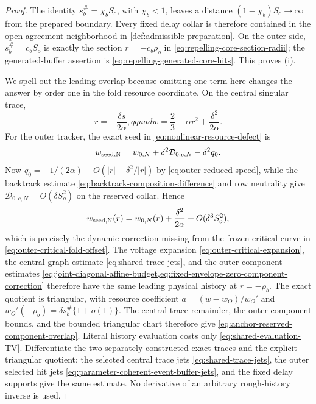 \begin{proof}
The identity \(s_b^\#=\chi_bS_c\), with \(\chi_b<1\), leaves a distance
\((1-\chi_b)S_c\to\infty\) from the prepared boundary.  Every fixed delay
collar is therefore contained in the open agreement neighborhood in
\cref{def:admissible-preparation}.  On the outer side,
\(s_b^\#=c_bS_o\) is exactly the section
\(r=-c_b\rho_o\) in
\cref{eq:repelling-core-section-radii}; the generated-buffer assertion is
\cref{eq:repelling-generated-core-hits}.  This proves (i).

We spell out the leading overlap because omitting one term here changes the
answer by order one in the fold resource coordinate.  On the central
singular trace,
\begin{equation}
 r=-\frac{\delta s}{2\alpha},qquad
 w=\frac23-\alpha r^2+\frac{\delta^2}{2\alpha}.     \label{eq:anchor-central-leading-overlap}
\end{equation}
For the outer tracker, the exact seed in
\cref{eq:nonlinear-resource-defect} is
\[
 w_{\rm seed,N}=w_{0,N}
       +\delta^2\mathcal D_{0,c,N}-\delta^2q_0.
\]
Now \(q_0=-1/(2\alpha)+O(|r|+\delta^2/|r|)\) by
\cref{eq:outer-reduced-speed}, while the backtrack estimate
\cref{eq:backtrack-composition-difference} and row neutrality give
\(\mathcal D_{0,c,N}=O(\delta S_o^2)\) on the reserved collar.  Hence
\begin{equation}
 w_{\rm seed,N}(r)
 =w_{0,N}(r)+\frac{\delta^2}{2\alpha}
       +O(\delta^3S_o^2),                           \label{eq:anchor-outer-dynamic-overlap}
\end{equation}
which is precisely the dynamic correction missing from the frozen critical
curve in \cref{eq:outer-critical-fold-offset}.  The voltage expansion
\cref{eq:outer-critical-expansion}, the central graph estimate
\cref{eq:shared-trace-jets}, and the outer component estimates
\cref{eq:joint-diagonal-affine-budget,eq:fixed-envelope-zero-component-correction}
therefore have the same leading physical history at \(r=-\rho_b\).
The exact quotient is triangular, with resource coefficient
\(a=(w-w_O)/w_O'\) and
\(w_O'(-\rho_b)=\delta s_b^\#\{1+o(1)\}\).  The central trace remainder,
the outer component bounds, and the bounded triangular chart therefore give
\cref{eq:anchor-reserved-component-overlap}.  Literal history evaluation
costs only \cref{eq:shared-evaluation-TV}.  Differentiate the two separately
constructed exact traces and the explicit triangular quotient; the selected
central trace jets \cref{eq:shared-trace-jets}, the outer
selected hit jets \cref{eq:parameter-coherent-event-buffer-jets}, and the
fixed delay supports give the same estimate.  No derivative
of an arbitrary rough-history inverse is used.

\end{proof}

